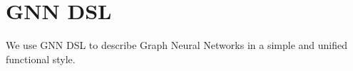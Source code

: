 \section{GNN DSL}
We use GNN DSL to describe Graph Neural Networks in a simple and unified functional style.

